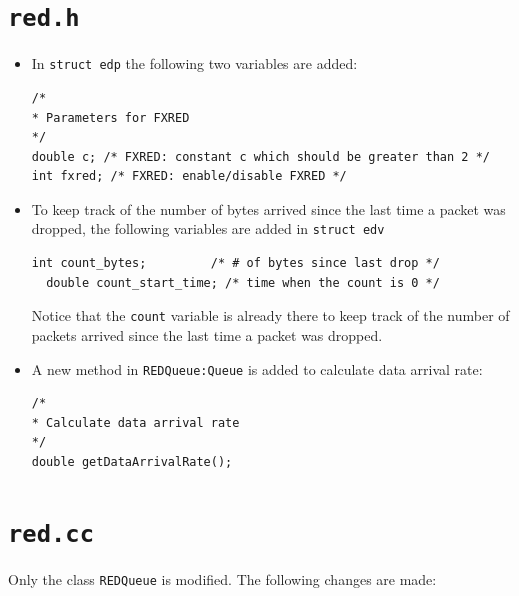 \documentclass[10pt]{report}
\begin{document}
\section*{\textbf{\texttt{red.h}}}
\begin{itemize}
  \item In \texttt{struct edp} the following two variables are added:
\begin{verbatim}
/*
* Parameters for FXRED
*/
double c; /* FXRED: constant c which should be greater than 2 */
int fxred; /* FXRED: enable/disable FXRED */
\end{verbatim}


  \item To keep track of the number of bytes arrived since the last time a packet was dropped, the following variables are added in \texttt{struct edv}
\begin{verbatim}
int count_bytes;		 /* # of bytes since last drop */
  double count_start_time; /* time when the count is 0 */
\end{verbatim}

Notice that the \texttt{count} variable is already there to keep track of the number of packets arrived since the last time a packet was dropped.

  \item A new method in \texttt{REDQueue:Queue} is added to calculate data arrival rate:
\begin{verbatim}
/*
* Calculate data arrival rate
*/
double getDataArrivalRate();
\end{verbatim}


\end{itemize}

\section*{\textbf{\texttt{red.cc}}}
Only the class \texttt{REDQueue} is modified. The following changes are made:
\end{document}
